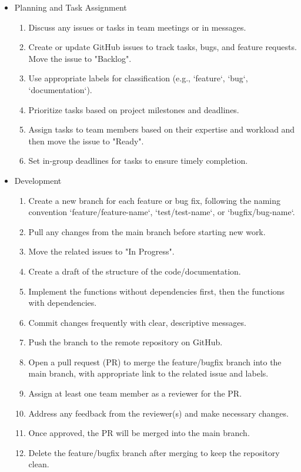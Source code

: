 \documentclass{article}
\begin{document}
\begin{itemize}
  \item Planning and Task Assignment
    \begin{enumerate}
      \item Discuss any issues or tasks in team meetings or in messages.
      \item Create or update GitHub issues to track tasks, bugs, and feature requests. Move the issue to "Backlog".
      \item Use appropriate labels for classification (e.g., `feature`, `bug`, `documentation`).
      \item Prioritize tasks based on project milestones and deadlines.
      \item Assign tasks to team members based on their expertise and workload and then move the issue to "Ready".
      \item Set in-group deadlines for tasks to ensure timely completion.
    \end{enumerate}
  \item Development
    \begin{enumerate}
      \item Create a new branch for each feature or bug fix, following the naming convention `feature/feature-name`, `test/test-name`, or `bugfix/bug-name`.
      \item Pull any changes from the main branch before starting new work.
      \item Move the related issues to "In Progress".
      \item Create a draft of the structure of the code/documentation.
      \item Implement the functions without dependencies first, then the functions with dependencies. 
      \item Commit changes frequently with clear, descriptive messages.
      \item Push the branch to the remote repository on GitHub.
      \item Open a pull request (PR) to merge the feature/bugfix branch into the main branch, with appropriate link to the related issue and labels.
      \item Assign at least one team member as a reviewer for the PR.
      \item Address any feedback from the reviewer(s) and make necessary changes.
      \item Once approved, the PR will be merged into the main branch.
      \item Delete the feature/bugfix branch after merging to keep the repository clean.

\end{enumerate}
\end{itemize}
\end{document}
